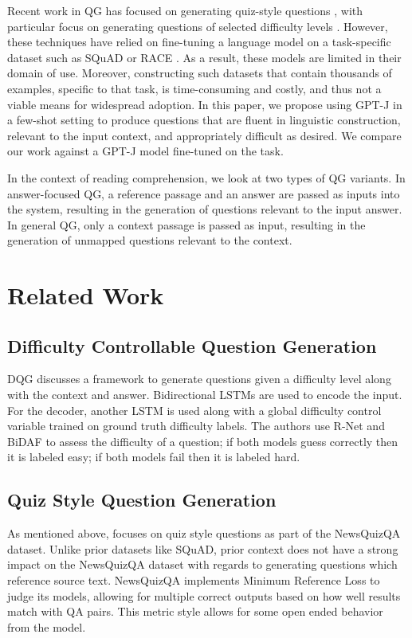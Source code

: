 \documentclass[11pt]{article}
\begin{document}
Recent work in QG has focused on generating quiz-style questions \citep{Quiz:1}, with particular focus on generating questions of selected difficulty levels \citep{Difficulty:3}. However, these techniques have relied on fine-tuning a language model on a task-specific dataset such as SQuAD \citep{squad:11} or RACE \citep{RACE:2}. As a result, these models are limited in their domain of use. Moreover, constructing such datasets that contain thousands of examples, specific to that task, is time-consuming and costly, and thus not a viable means for widespread adoption. In this paper, we propose using GPT-J in a few-shot setting to produce questions that are fluent in linguistic construction, relevant to the input context, and appropriately difficult as desired. We compare our work against a GPT-J model fine-tuned on the task.

In the context of reading comprehension, we look at two types of QG variants. In answer-focused QG, a reference passage and an answer are passed as inputs into the system, resulting in the generation of questions relevant to the input answer. In general QG, only a context passage is passed as input, resulting in the generation of unmapped questions relevant to the context.

\section{Related Work}

\subsection{Difficulty Controllable Question Generation}

DQG discusses a framework to generate questions given a difficulty level along with the context and answer. Bidirectional LSTMs are used to encode the input. For the decoder, another LSTM is used along with a global difficulty control variable trained on ground truth difficulty labels. The authors use R-Net and BiDAF to assess the difficulty of a question; if both models guess correctly then it is labeled easy; if both models fail then it is labeled hard. 

\subsection{Quiz Style Question Generation}
As mentioned above, \citep{Quiz:1} focuses on quiz style questions as part of the NewsQuizQA dataset. Unlike prior datasets like SQuAD, prior context does not have a strong impact on the NewsQuizQA dataset with regards to generating questions which reference source text. NewsQuizQA implements Minimum Reference Loss to judge its models, allowing for multiple correct outputs based on how well results match with QA pairs. This metric style allows for some open ended behavior from the model.
\end{document}
